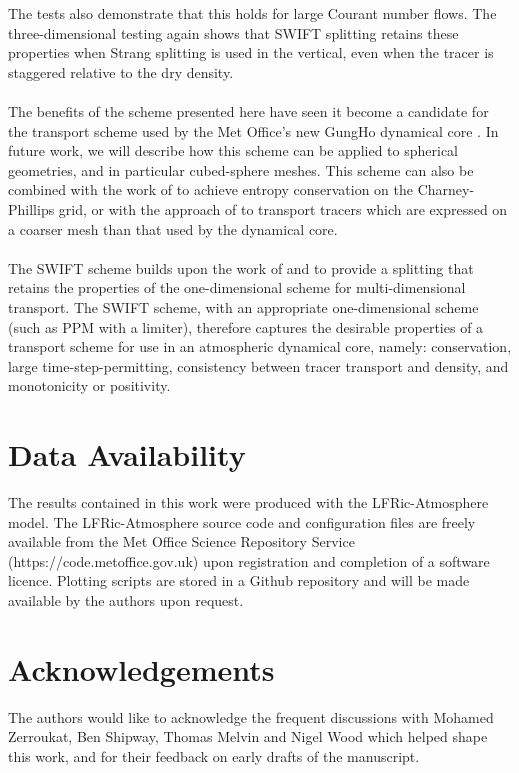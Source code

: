 \documentclass[11pt,a4paper]{article}
\begin{document}
The tests also demonstrate that this holds for large Courant number flows. The three-dimensional testing again shows that SWIFT splitting retains these properties when Strang splitting is used in the vertical, even when the tracer is staggered relative to the dry density. \\
\\
The benefits of the scheme presented here have seen it become a candidate for the transport scheme used by the Met Office's new GungHo dynamical core \citep{melvin2024mixed}.
In future work, we will describe how this scheme can be applied to spherical geometries, and in particular cubed-sphere meshes.
This scheme can also be combined with the work of \citet{thuburn2022numerical} to achieve entropy conservation on the Charney-Phillips grid, or with the approach of \citet{brown2023physics} to transport tracers which are expressed on a coarser mesh than that used by the dynamical core. \\
\\
The SWIFT scheme builds upon the work of \citet{lin1996ffsl,leonard1996cosmic} and \citet{skamarock2006limiters} to provide a splitting that retains the properties of the one-dimensional scheme for multi-dimensional transport.
The SWIFT scheme, with an appropriate one-dimensional scheme (such as PPM with a limiter), therefore captures the desirable properties of a transport scheme for use in an atmospheric dynamical core, namely: conservation, large time-step-permitting, consistency between tracer transport and density, and monotonicity or positivity. 

\section*{Data Availability}
The results contained in this work were produced with the LFRic-Atmosphere model.
The LFRic-Atmosphere source code and configuration files are freely available from the Met Office Science Repository Service \\
(https://code.metoffice.gov.uk) upon registration and completion of a software licence.
Plotting scripts are stored in a Github repository and will be made available by the authors upon request.

\section*{Acknowledgements}
The authors would like to acknowledge the frequent discussions with Mohamed Zerroukat, Ben Shipway, Thomas Melvin and Nigel Wood which helped shape this work, and for their feedback on early drafts of the manuscript.
\end{document}
